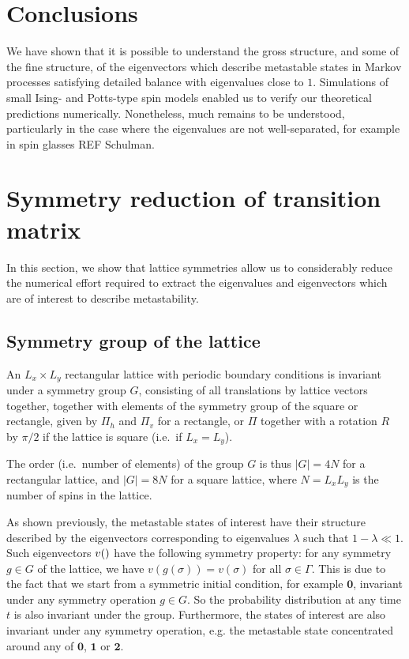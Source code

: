 \documentclass[10pt]{article}
\renewcommand{\v}[1]{v(#1)}
\newcommand{\zeros}{\mathbf{0}}
\newcommand{\ones}{\mathbf{1}}
\newcommand{\twos}{\mathbf{2}}
\newcommand{\size}[1]{\left| #1 \right|}
\begin{document}
\section{Conclusions}

We have shown that it is possible to understand the gross structure, and some of the fine structure, of the eigenvectors which describe metastable states in Markov processes satisfying detailed balance with eigenvalues close to $1$.  Simulations of small Ising- and Potts-type spin models enabled us to verify our theoretical predictions numerically. Nonetheless, much remains to be understood, particularly in the case where the eigenvalues are not well-separated, for example in spin glasses REF Schulman.


\appendix
\section{Symmetry reduction of transition matrix}


In this section, we show that lattice symmetries 
allow us to considerably reduce the numerical effort required to extract the
eigenvalues and eigenvectors which are of interest to describe metastability.


\subsection{Symmetry group of the lattice}

An $L_x \times L_y$ rectangular lattice with periodic boundary
conditions is invariant under a symmetry group $G$, consisting of all
translations by lattice vectors together, together with elements of the 
symmetry group of the square or rectangle, given by 
$\Pi_h$ and $\Pi_v$ for a rectangle, 
or $\Pi$ together with a rotation $R$ by $\pi/2$ if the lattice is 
square (i.e.\ if $L_x = L_y$).  

The order (i.e.\ number of elements) of the group $G$ is thus
$\size{G} = 4N$ for a rectangular lattice, and
$\size{G} = 8N$ for a square lattice, where $N = L_x L_y$ is
the number of spins in the lattice.

As shown previously, the metastable states of interest have their structure
described by the eigenvectors corresponding to eigenvalues $\lambda$ such that
$1-\lambda \ll 1$. Such eigenvectors $\v$  have the following symmetry property:
for any symmetry $g \in G$ of the
lattice, we have $v(g(\sigma)) = v(\sigma)$
 for all $\sigma \in \Gamma$.
This is due to the fact that we start from a symmetric initial
condition, for example $\zeros$, invariant under any symmetry operation $g
\in G$.
So the probability distribution at any time $t$ is also invariant under the group.
Furthermore, the states of interest are also invariant under any symmetry
operation, e.g. the metastable state concentrated around any of $\zeros$,
$\ones$ or $\twos$.
\end{document}
